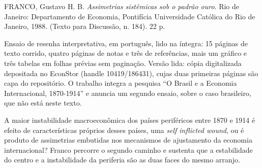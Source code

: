 
\begin{identificacao}
FRANCO, Gustavo H. B. \textit{Assimetrias sistêmicas sob o padrão ouro}. Rio de
Janeiro: Departamento de Economia, Pontifícia Universidade Católica do Rio de
Janeiro, 1988. (Texto para Discussão, n. 184). 22 p.

Ensaio de resenha interpretativa, em português, lido na íntegra: 15 páginas de
texto corrido, quatro páginas de notas e três de referências, mais um gráfico e
três tabelas em folhas prévias sem paginação. Versão lida: cópia digitalizada
depositada no EconStor (handle 10419/186431), cujas duas primeiras páginas são
capa do repositório. O trabalho integra a pesquisa ``O Brasil e a Economia
Internacional, 1870-1914'' e anuncia um segundo ensaio, sobre o caso
brasileiro, que não está neste texto.
\end{identificacao}


A maior instabilidade macroeconômica dos países periféricos entre 1870 e 1914 é
efeito de características próprios desses países, uma \textit{self inflicted
wound}, ou é produto de assimetrias embutidas nos mecanismos de ajustamento da
economia internacional? Franco percorre o segundo caminho e sustenta que a
estabilidade do centro e a instabilidade da periferia são as duas faces do
mesmo arranjo.



